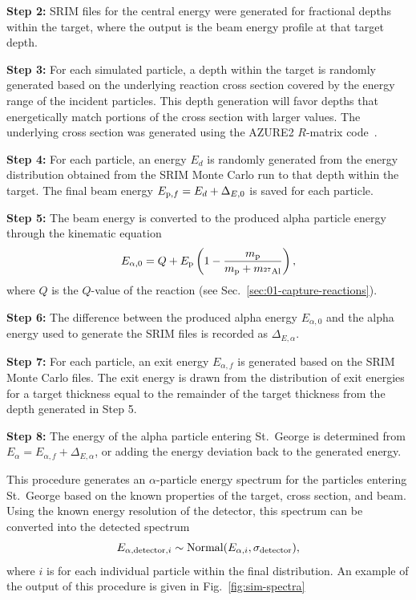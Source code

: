 \textbf{Step 2:}
  SRIM files for the central energy were generated for fractional depths
  within the target, where the output is the beam energy profile at that
  target depth.

\textbf{Step 3:}
  For each simulated particle, a depth within the target is randomly
  generated based on the underlying reaction cross section covered by
  the energy range of the incident particles. This depth generation will
  favor depths that energetically match portions of the cross section
  with larger values. The underlying cross section was generated using
  the AZURE2 $R$-matrix code~\cite{AZURE2, deBoer2017}.

\textbf{Step 4:}
  For each particle, an energy $E_d$ is randomly generated from the
  energy distribution obtained from the SRIM Monte Carlo run to that
  depth within the target. The final beam energy $E_{{\rm p},f} = E_d +
  \Delta_{E,0}$ is saved for each particle.

\textbf{Step 5:}
  The beam energy is converted to the produced alpha particle energy
  through the kinematic equation
  \[
      E_{\alpha,0} = Q + E_{\rm p}\left(
          1 - \frac{m_{\rm p}}{m_{\rm p} + m_{\mnuc{27}{Al}}} %
      \right),
  \]
  where $Q$ is the $Q$-value of the reaction (see
  Sec.~\ref{sec:01-capture-reactions}).

\textbf{Step 6:}
  The difference between the produced alpha energy $E_{\alpha,0}$ and
  the alpha energy used to generate the SRIM files is recorded as
  $\Delta_{E,\alpha}$.

\textbf{Step 7:}
  For each particle, an exit energy $E_{\alpha,f}$ is generated based on
  the SRIM Monte Carlo files. The exit energy is drawn from the
  distribution of exit energies for a target thickness equal to the
  remainder of the target thickness from the depth generated in Step 5.

\textbf{Step 8:}
  The energy of the alpha particle entering St.\ George is determined
  from $E_{\alpha} = E_{\alpha,f} + \Delta_{E,\alpha}$, or adding the
  energy deviation back to the generated energy.

This procedure generates an $\alpha$-particle energy spectrum for the
particles entering St.\ George based on the known properties of the
target, cross section, and beam. Using the known energy resolution of
the detector, this spectrum can be converted into the detected spectrum
\[
    E_{\alpha,{\rm detector},i} \sim {\rm Normal}(E_{\alpha,i},\sigma_{\rm detector}),
\]
where $i$ is for each individual particle within the final distribution.
An example of the output of this procedure is given in
Fig.~\ref{fig:sim-spectra}

